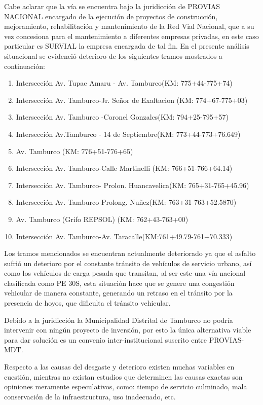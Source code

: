 Cabe aclarar que la vía se encuentra bajo la juridicción de PROVIAS NACIONAL encargado de la ejecución de proyectos de construcción, mejoramiento, rehabilitación y mantenimiento de la Red Vial Nacional, que a su vez concesiona para el mantenimiento a diferentes empresas privadas, en este caso particular es SURVIAL la empresa encargada de tal fin.
En el presente análisis situacional se evidenció deterioro de los siguientes tramos mostrados a continuación:
\begin{enumerate}[noitemsep]
	\item Intersección Av. Tupac Amaru - Av. Tamburco(KM: 775+44-775+74)
	\item Intersección Av. Tamburco-Jr. Señor de Exaltacion (KM: 774+67-775+03)
	\item Intersección Av. Tamburco -Coronel Gonzales(KM: 794+25-795+57)
	\item Intersección Av.Tamburco - 14 de Septiembre(KM: 773+44-773+76.649)
	\item Av. Tamburco (KM: 776+51-776+65)
	\item Intersección Av. Tamburco-Calle Martinelli (KM: 766+51-766+64.14)
	\item Intersección Av. Tamburco- Prolon. Huancavelica(KM: 765+31-765+45.96)
	\item Intersección Av. Tamburco-Prolong. Nuñez(KM: 763+31-763+52.5870)
	\item Av. Tamburco (Grifo REPSOL) (KM: 762+43-763+00)
	\item Intersección Av. Tamburco-Av. Taracalle(KM:761+49.79-761+70.333)
\end{enumerate}

Los tramos mencionados se encuentran actualmente deteriorado ya que el asfalto sufrió un deterioro por el constante tránsito de vehículos de servicio urbano, así como los vehículos de carga pesada que transitan, al ser este una vía nacional clasificada como PE 30S, esta situación hace que se genere una congestión vehicular de manera constante, generando un retraso en el tránsito por la presencia de hoyos, que dificulta el tránsito vehicular.

Debido a la juridicción la Municipalidad Distrital de Tamburco no podría intervenir con ningún proyecto de inversión, por esto la única alternativa viable para dar solución es un convenio inter-institucional suscrito entre PROVIAS-MDT.

Respecto a las causas del desgaste y deterioro existen muchas variables en cuestión, mientras no existan estudios que determinen las causas exactas son opiniones meramente especulativos, como: tiempo de servicio culminado, mala conservación de la infraestructura, uso inadecuado, etc.
